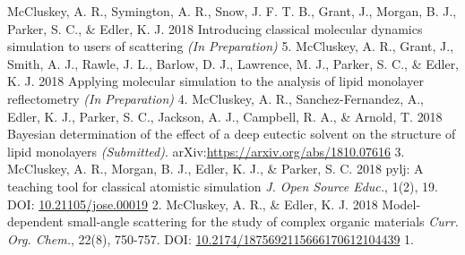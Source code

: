 \begin{cvpubys}
  \cvpuby
    {McCluskey, A. R., Symington, A. R., Snow, J. F. T. B., Grant, J., Morgan, B. J., Parker, S. C., \& Edler, K. J.}
    {2018}
    {Introducing classical molecular dynamics simulation to users of scattering}
    {\emph{(In Preparation)}}
    {5.}
  \cvpuby
    {McCluskey, A. R., Grant, J., Smith, A. J., Rawle, J. L., Barlow, D. J., Lawrence, M. J., Parker, S. C., \& Edler, K. J.}
    {2018}
    {Applying molecular simulation to the analysis of lipid monolayer reflectometry}
    {\emph{(In Preparation)}}
    {4.}
  \cvpuby
  	{McCluskey, A. R., Sanchez-Fernandez, A., Edler, K. J., Parker, S. C., Jackson, A. J., Campbell, R. A., \& Arnold, T.}
    {2018}
    {Bayesian determination of the effect of a deep eutectic solvent on the structure of lipid monolayers}
    {\emph{(Submitted)}. arXiv:\href{1810.07616}{https://arxiv.org/abs/1810.07616}}
    {3.}
  \cvpuby
  	{McCluskey, A. R., Morgan, B. J., Edler, K. J., \& Parker, S. C.}
  	{2018}
  	{pylj: A teaching tool for classical atomistic simulation}
  	{\emph{J. Open Source Educ.}, 1(2), 19. DOI: \href{http://doi.org/10.21105/jose.00019}{10.21105/jose.00019}}
  	{2.}
  \cvpuby
    {McCluskey, A. R., \& Edler, K. J.}
    {2018}
    {Model-dependent small-angle scattering for the study of complex organic materials}
	  {\emph{Curr. Org. Chem.}, 22(8), 750-757. DOI: \href{http://doi.org/10.2174/1875692115666170612104439}{10.2174/1875692115666170612104439}}
    {1.}
\end{cvpubys}
